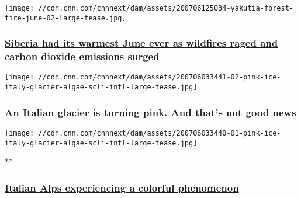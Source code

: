 \href{/2020/07/07/weather/siberia-arctic-temperature-wildfires-intl/index.html}{}

\texttt{[image: //cdn.cnn.com/cnnnext/dam/assets/200706125034-yakutia-forest-fire-june-02-large-tease.jpg]}

\hypertarget{siberia-had-its-warmest-june-ever-as-wildfires-raged-and-carbon-dioxide-emissions-surged}{%
\subsubsection{\texorpdfstring{\href{/2020/07/07/weather/siberia-arctic-temperature-wildfires-intl/index.html}{Siberia
had its warmest June ever as wildfires raged and carbon dioxide
emissions
surged}}{Siberia had its warmest June ever as wildfires raged and carbon dioxide emissions surged}}\label{siberia-had-its-warmest-june-ever-as-wildfires-raged-and-carbon-dioxide-emissions-surged}}

\href{/travel/article/pink-snow-italy-glacier-algae-scli-intl-scn/index.html}{}

\texttt{[image: //cdn.cnn.com/cnnnext/dam/assets/200706033441-02-pink-ice-italy-glacier-algae-scli-intl-large-tease.jpg]}

\hypertarget{an-italian-glacier-is-turning-pink-and-thats-not-good-news}{%
\subsubsection{\texorpdfstring{\href{/travel/article/pink-snow-italy-glacier-algae-scli-intl-scn/index.html}{An
Italian glacier is turning pink. And that's not good
news}}{An Italian glacier is turning pink. And that's not good news}}\label{an-italian-glacier-is-turning-pink-and-thats-not-good-news}}

\href{/videos/weather/2020/07/06/italy-pink-snow-algae-orig-vstop-bdk.cnn}{}

\texttt{[image: //cdn.cnn.com/cnnnext/dam/assets/200706033440-01-pink-ice-italy-glacier-algae-scli-intl-large-tease.jpg]}

**

\hypertarget{italian-alps-experiencing-a-colorful-phenomenon}{%
\subsubsection{\texorpdfstring{\href{/videos/weather/2020/07/06/italy-pink-snow-algae-orig-vstop-bdk.cnn}{Italian
Alps experiencing a colorful
phenomenon}}{Italian Alps experiencing a colorful phenomenon}}\label{italian-alps-experiencing-a-colorful-phenomenon}}

